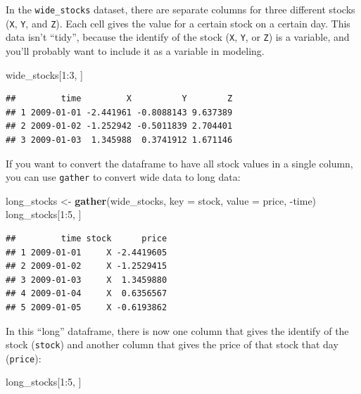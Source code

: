 \documentclass[]{book}
\makeatletter
\newenvironment{Shaded}{\begin{snugshade}}{\end{snugshade}}
\newcommand{\KeywordTok}[1]{\textcolor[rgb]{0.13,0.29,0.53}{\textbf{{#1}}}}
\newcommand{\DataTypeTok}[1]{\textcolor[rgb]{0.13,0.29,0.53}{{#1}}}
\newcommand{\DecValTok}[1]{\textcolor[rgb]{0.00,0.00,0.81}{{#1}}}
\newcommand{\StringTok}[1]{\textcolor[rgb]{0.31,0.60,0.02}{{#1}}}
\newcommand{\NormalTok}[1]{{#1}}
\newenvironment{kframe}{%
\medskip{}
\setlength{\fboxsep}{.8em}
 \def\at@end@of@kframe{}%
 \ifinner\ifhmode%
  \def\at@end@of@kframe{\end{minipage}}%
  \begin{minipage}{\columnwidth}%
 \fi\fi%
 \def\FrameCommand##1{\hskip\@totalleftmargin \hskip-\fboxsep
 \colorbox{shadecolor}{##1}\hskip-\fboxsep
     \hskip-\linewidth \hskip-\@totalleftmargin \hskip\columnwidth}%
 \MakeFramed {\advance\hsize-\width
   \@totalleftmargin\z@ \linewidth\hsize
   \@setminipage}}%
 {\par\unskip\endMakeFramed%
 \at@end@of@kframe}
\renewenvironment{Shaded}{\begin{kframe}}{\end{kframe}}
\makeatother
\begin{document}
In the \texttt{wide\_stocks} dataset, there are separate columns for
three different stocks (\texttt{X}, \texttt{Y}, and \texttt{Z}). Each
cell gives the value for a certain stock on a certain day. This data
isn't ``tidy'', because the identify of the stock (\texttt{X},
\texttt{Y}, or \texttt{Z}) is a variable, and you'll probably want to
include it as a variable in modeling.

\begin{Shaded}
\begin{Highlighting}[]
\NormalTok{wide_stocks[}\DecValTok{1}\NormalTok{:}\DecValTok{3}\NormalTok{, ]}
\end{Highlighting}
\end{Shaded}

\begin{verbatim}
##         time         X          Y        Z
## 1 2009-01-01 -2.441961 -0.8088143 9.637389
## 2 2009-01-02 -1.252942 -0.5011839 2.704401
## 3 2009-01-03  1.345988  0.3741912 1.671146
\end{verbatim}

If you want to convert the dataframe to have all stock values in a
single column, you can use \texttt{gather} to convert wide data to long
data:

\begin{Shaded}
\begin{Highlighting}[]
\NormalTok{long_stocks <-}\StringTok{ }\KeywordTok{gather}\NormalTok{(wide_stocks, }\DataTypeTok{key =} \NormalTok{stock,}
                      \DataTypeTok{value =} \NormalTok{price, -time)}
\NormalTok{long_stocks[}\DecValTok{1}\NormalTok{:}\DecValTok{5}\NormalTok{, ]}
\end{Highlighting}
\end{Shaded}

\begin{verbatim}
##         time stock      price
## 1 2009-01-01     X -2.4419605
## 2 2009-01-02     X -1.2529415
## 3 2009-01-03     X  1.3459880
## 4 2009-01-04     X  0.6356567
## 5 2009-01-05     X -0.6193862
\end{verbatim}

In this ``long'' dataframe, there is now one column that gives the
identify of the stock (\texttt{stock}) and another column that gives the
price of that stock that day (\texttt{price}):

\begin{Shaded}
\begin{Highlighting}[]
\NormalTok{long_stocks[}\DecValTok{1}\NormalTok{:}\DecValTok{5}\NormalTok{, ]}
\end{Highlighting}
\end{Shaded}
\end{document}
